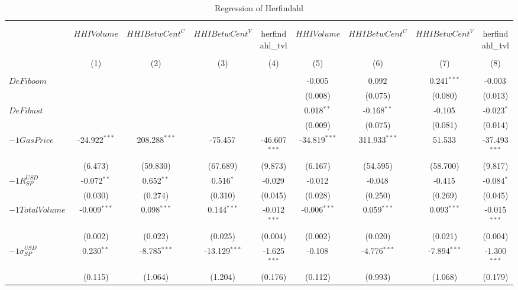 \begin{table}[!htbp] \centering
  \caption{Regression of Herfindahl}
\begin{tabular}{@{\extracolsep{5pt}}lcccccccc}
\\[-1.8ex]\hline
\hline \\[-1.8ex]
\\[-1.8ex] & \multicolumn{1}{c}{${	 HHIVolume}$} & \multicolumn{1}{c}{${	 HHIBetwCent}^C$} & \multicolumn{1}{c}{${	 HHIBetwCent}^V$} & \multicolumn{1}{c}{herfindahl_tvl} & \multicolumn{1}{c}{${	 HHIVolume}$} & \multicolumn{1}{c}{${	 HHIBetwCent}^C$} & \multicolumn{1}{c}{${	 HHIBetwCent}^V$} & \multicolumn{1}{c}{herfindahl_tvl}  \\
\\[-1.8ex] & (1) & (2) & (3) & (4) & (5) & (6) & (7) & (8) \\
\hline \\[-1.8ex]
 ${	 DeFiboom}$ & & & & & -0.005$^{}$ & 0.092$^{}$ & 0.241$^{***}$ & -0.003$^{}$ \\
  & & & & & (0.008) & (0.075) & (0.080) & (0.013) \\
 ${	 DeFibust}$ & & & & & 0.018$^{**}$ & -0.168$^{**}$ & -0.105$^{}$ & -0.023$^{*}$ \\
  & & & & & (0.009) & (0.075) & (0.081) & (0.014) \\
 ${	-1 GasPrice}$ & -24.922$^{***}$ & 208.288$^{***}$ & -75.457$^{}$ & -46.607$^{***}$ & -34.819$^{***}$ & 311.933$^{***}$ & 51.533$^{}$ & -37.493$^{***}$ \\
  & (6.473) & (59.830) & (67.689) & (9.873) & (6.167) & (54.595) & (58.700) & (9.817) \\
 ${	-1 R}^{USD}_{SP}$ & -0.072$^{**}$ & 0.652$^{**}$ & 0.516$^{*}$ & -0.029$^{}$ & -0.012$^{}$ & -0.048$^{}$ & -0.415$^{}$ & -0.084$^{*}$ \\
  & (0.030) & (0.274) & (0.310) & (0.045) & (0.028) & (0.250) & (0.269) & (0.045) \\
 ${	-1 TotalVolume}$ & -0.009$^{***}$ & 0.098$^{***}$ & 0.144$^{***}$ & -0.012$^{***}$ & -0.006$^{***}$ & 0.059$^{***}$ & 0.093$^{***}$ & -0.015$^{***}$ \\
  & (0.002) & (0.022) & (0.025) & (0.004) & (0.002) & (0.020) & (0.021) & (0.004) \\
 ${	-1 \sigma}^{USD}_{SP}$ & 0.230$^{**}$ & -8.785$^{***}$ & -13.129$^{***}$ & -1.625$^{***}$ & -0.108$^{}$ & -4.776$^{***}$ & -7.894$^{***}$ & -1.300$^{***}$ \\
  & (0.115) & (1.064) & (1.204) & (0.176) & (0.112) & (0.993) & (1.068) & (0.179) \\

\end{tabular}
\end{table}
